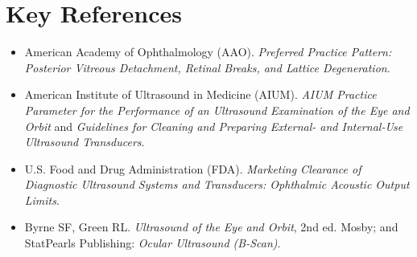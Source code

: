 \section{Key References}
\begin{itemize}
    \item American Academy of Ophthalmology (AAO). \textit{Preferred Practice Pattern: Posterior Vitreous Detachment, Retinal Breaks, and Lattice Degeneration}.
    \item American Institute of Ultrasound in Medicine (AIUM). \textit{AIUM Practice Parameter for the Performance of an Ultrasound Examination of the Eye and Orbit} and \textit{Guidelines for Cleaning and Preparing External- and Internal-Use Ultrasound Transducers}.
    \item U.S. Food and Drug Administration (FDA). \textit{Marketing Clearance of Diagnostic Ultrasound Systems and Transducers: Ophthalmic Acoustic Output Limits}.
    \item Byrne SF, Green RL. \textit{Ultrasound of the Eye and Orbit}, 2nd ed. Mosby; and StatPearls Publishing: \textit{Ocular Ultrasound (B-Scan)}.
\end{itemize}
